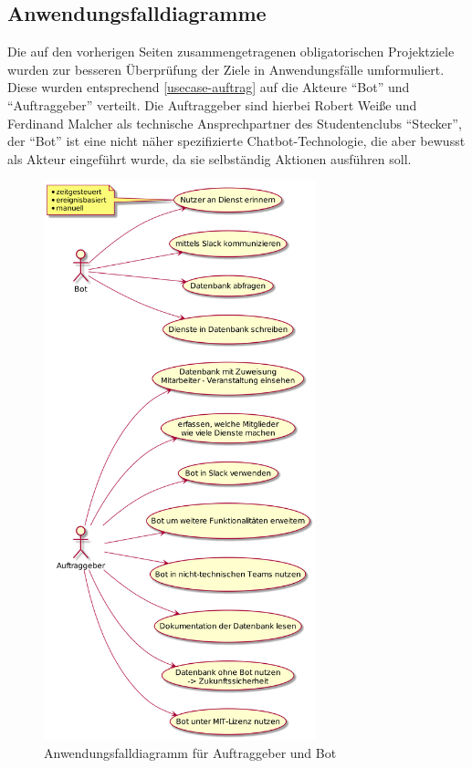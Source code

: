\subsection{Anwendungsfalldiagramme}


Die auf den vorherigen Seiten zusammengetragenen obligatorischen Projektziele wurden zur besseren Überprüfung der Ziele in Anwendungsfälle umformuliert. Diese wurden entsprechend \autoref{usecase-auftrag} auf die Akteure \enquote{Bot} und \enquote{Auftraggeber} verteilt.
Die Auftraggeber sind hierbei Robert Weiße und Ferdinand Malcher als technische Ansprechpartner des Studentenclubs \enquote{Stecker}, der \enquote{Bot} ist eine nicht näher spezifizierte Chatbot-Technologie, die aber bewusst als Akteur eingeführt wurde, da sie selbständig Aktionen ausführen soll.


\begin{figure}[htbp]
    \includegraphics[width=0.7\textwidth]{../docs/uml/usecase-stakeholder.png}
    \caption{Anwendungsfalldiagramm für Auftraggeber und Bot}
    \label{usecase-auftrag}
\end{figure}



